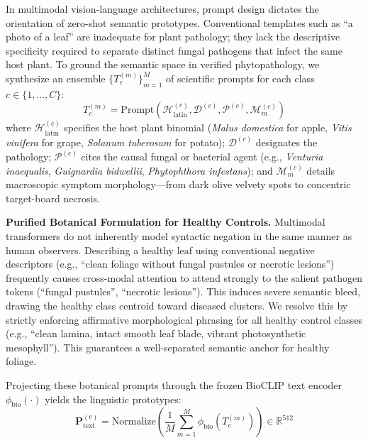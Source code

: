 \documentclass[conference]{IEEEtran}
\begin{document}
In multimodal vision-language architectures, prompt design dictates the orientation of zero-shot semantic prototypes. Conventional templates such as ``a photo of a leaf'' \cite{radford2021clip, zhou2022coop} are inadequate for plant pathology; they lack the descriptive specificity required to separate distinct fungal pathogens that infect the same host plant. To ground the semantic space in verified phytopathology, we synthesize an ensemble $\{T_c^{(m)}\}_{m=1}^M$ of scientific prompts for each class $c \in \{1, \dots, C\}$:
\begin{equation}
T_c^{(m)} = \text{Prompt}\left(\mathcal{H}_{\text{latin}}^{(c)}, \mathcal{D}^{(c)}, \mathcal{P}^{(c)}, \mathcal{M}_m^{(c)}\right)
\end{equation}
where $\mathcal{H}_{\text{latin}}^{(c)}$ specifies the host plant binomial (\textit{Malus domestica} for apple, \textit{Vitis vinifera} for grape, \textit{Solanum tuberosum} for potato); $\mathcal{D}^{(c)}$ designates the pathology; $\mathcal{P}^{(c)}$ cites the causal fungal or bacterial agent (e.g., \textit{Venturia inaequalis}, \textit{Guignardia bidwellii}, \textit{Phytophthora infestans}); and $\mathcal{M}_m^{(c)}$ details macroscopic symptom morphology---from dark olive velvety spots to concentric target-board necrosis.

\textbf{Purified Botanical Formulation for Healthy Controls.} Multimodal transformers do not inherently model syntactic negation in the same manner as human observers. Describing a healthy leaf using conventional negative descriptors (e.g., ``clean foliage without fungal pustules or necrotic lesions'') frequently causes cross-modal attention to attend strongly to the salient pathogen tokens (``fungal pustules'', ``necrotic lesions''). This induces severe semantic bleed, drawing the healthy class centroid toward diseased clusters. We resolve this by strictly enforcing affirmative morphological phrasing for all healthy control classes (e.g., ``clean lamina, intact smooth leaf blade, vibrant photosynthetic mesophyll''). This guarantees a well-separated semantic anchor for healthy foliage.

Projecting these botanical prompts through the frozen BioCLIP text encoder $\phi_{\text{bio}}(\cdot)$ yields the linguistic prototypes:
\begin{equation}
\mathbf{P}_{\text{text}}^{(c)} = \text{Normalize}\left(\frac{1}{M}\sum_{m=1}^M \phi_{\text{bio}}(T_c^{(m)})\right) \in \mathbb{R}^{512}
\end{equation}
\end{document}
